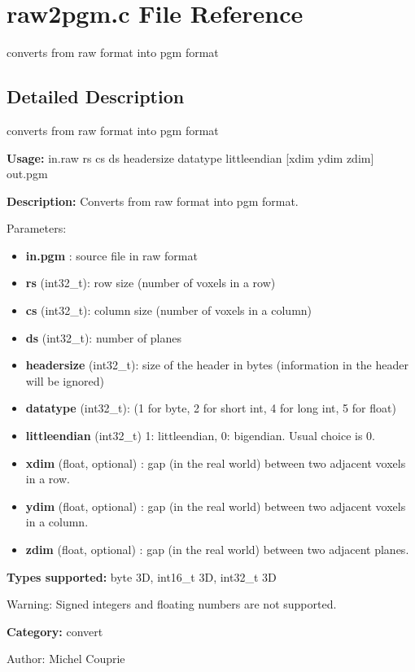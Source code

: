 \section{raw2pgm.c File Reference}
\label{raw2pgm_8c}
converts from raw format into pgm format  




\label{_details}
\subsection{Detailed Description}
converts from raw format into pgm format 

{\bf Usage:} in.raw rs cs ds headersize datatype littleendian [xdim ydim zdim] out.pgm

{\bf Description:} Converts from raw format into pgm format.

Parameters: \begin{itemize}
\item {\bf in.pgm} : source file in raw format \item {\bf rs} (int32\_\-t): row size (number of voxels in a row) \item {\bf cs} (int32\_\-t): column size (number of voxels in a column) \item {\bf ds} (int32\_\-t): number of planes \item {\bf headersize} (int32\_\-t): size of the header in bytes (information in the header will be ignored) \item {\bf datatype} (int32\_\-t): (1 for byte, 2 for short int, 4 for long int, 5 for float) \item {\bf littleendian} (int32\_\-t) 1: littleendian, 0: bigendian. Usual choice is 0. \item {\bf xdim} (float, optional) : gap (in the real world) between two adjacent voxels in a row. \item {\bf ydim} (float, optional) : gap (in the real world) between two adjacent voxels in a column. \item {\bf zdim} (float, optional) : gap (in the real world) between two adjacent planes.\end{itemize}
{\bf Types supported:} byte 3D, int16\_\-t 3D, int32\_\-t 3D

\begin{Desc}
\item[Warning:]Signed integers and floating numbers are not supported.\end{Desc}
{\bf Category:} convert

\begin{Desc}
\item[Author:]Michel Couprie \end{Desc}
